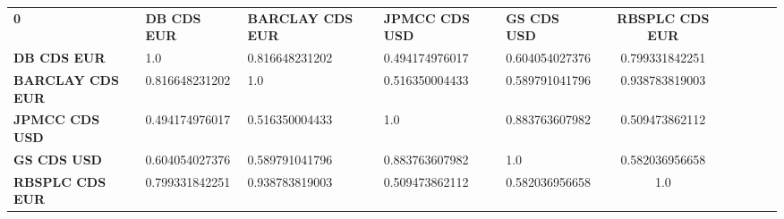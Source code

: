 \begin{tabular}{|l|l|l|l|l|c|c|c|c|c|}
\hline
\textbf{0} & \textbf{DB CDS EUR} & \textbf{BARCLAY CDS EUR} & \textbf{JPMCC CDS USD} & \textbf{GS CDS USD} & \textbf{RBSPLC CDS EUR}\\\hhline{|=|=|=|=|=|=|}
\textbf{DB CDS EUR} & 1.0 & 0.816648231202 & 0.494174976017 & 0.604054027376 & 0.799331842251\\
\textbf{BARCLAY CDS EUR} & 0.816648231202 & 1.0 & 0.516350004433 & 0.589791041796 & 0.938783819003\\
\textbf{JPMCC CDS USD} & 0.494174976017 & 0.516350004433 & 1.0 & 0.883763607982 & 0.509473862112\\
\textbf{GS CDS USD} & 0.604054027376 & 0.589791041796 & 0.883763607982 & 1.0 & 0.582036956658\\
\textbf{RBSPLC CDS EUR} & 0.799331842251 & 0.938783819003 & 0.509473862112 & 0.582036956658 & 1.0\\
\hline
\end{tabular}
